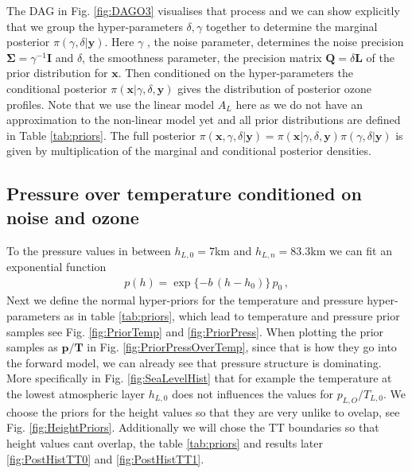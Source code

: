 The DAG in Fig. \ref{fig:DAGO3} visualises that process and we can show explicitly that we group the hyper-parameters $\delta, \gamma$ together to determine the marginal posterior $\pi(\gamma, \delta | \bm{y})$.
Here $\gamma$ , the noise parameter, determines the noise precision $\bm{\Sigma} = \gamma ^{-1} \bm{I}$ and $\delta$, the smoothness parameter, the precision matrix $\bm{Q} = \delta \bm{L}$ of the prior distribution for $\bm{x}$.
Then conditioned on the hyper-parameters the conditional posterior $\pi( \bm{x} |\gamma, \delta, \bm{y})$ gives the distribution of posterior ozone profiles.
Note that we use the linear model $A_L$ here as we do not have an approximation to the non-linear model yet and all prior distributions are defined in Table \ref{tab:priors}.
The full posterior $\pi(\bm{x},\gamma, \delta | \bm{y}) =  \pi(\bm{x}|\gamma, \delta ,\bm{y}) \pi(\gamma, \delta | \bm{y}) $ is given by multiplication of the marginal and conditional posterior densities. 


\subsection{Pressure over temperature conditioned on noise and ozone}
\label{subsec:presTempPrior}
To the pressure values in between $h_{L,0}=7$km and $h_{L,n} = 83.3$km we can fit an exponential function
\begin{align}
	p(h) =
	\exp{ \{ -b \,  (h - h_{0} ) \} } \,  p_0 \, ,
	\label{eq:pressFunc}
\end{align}
Next we define the normal hyper-priors for the temperature and pressure hyper-parameters as in table \ref{tab:priors}, which lead to temperature and pressure prior samples see Fig. \ref{fig:PriorTemp} and \ref{fig:PriorPress}.
When plotting the prior samples as $\bm{p} / \bm{T}$ in Fig. \ref{fig:PriorPressOverTemp}, since that is how they go into the forward model, we can already see that pressure structure is dominating.
More specifically in Fig. \ref{fig:SeaLevelHist} that for example the temperature at the lowest atmospheric layer $h_{L,0}$ does not influences the values for $p_{L,O}/T_{L,0}$.
We choose the priors for the height values so that they are very unlike to ovelap, see Fig. \ref{fig:HeightPriors}.
Additionally we will chose the TT boundaries so that height values cant overlap, the table \ref{tab:priors} and results later \ref{fig:PostHistTT0} and \ref{fig:PostHistTT1}.

